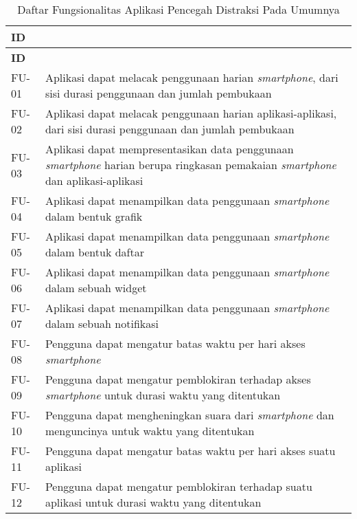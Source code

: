 \RaggedLeft
\begin{footnotesize}
\begin{longtable}[c]{|W{c}{0.08\textwidth}|>{\ccnormspacing}m{0.82\textwidth}|}
  \caption{Daftar Fungsionalitas Aplikasi Pencegah Distraksi Pada Umumnya}
  \label{tab:daftar_fungsionalitas_app_umum} \\
  \hline {} \textbf{ID} &  \\ \hline \endfirsthead
  \hline {} \textbf{ID} &  \\ \hline \endhead
  
  \hline \endfoot
  
  FU-01  &  Aplikasi dapat melacak penggunaan harian \textit{smartphone}, dari sisi durasi penggunaan dan jumlah pembukaan \\ \hline
  FU-02  &  Aplikasi dapat melacak penggunaan harian aplikasi-aplikasi, dari sisi durasi penggunaan dan jumlah pembukaan \\ \hline
  FU-03  &  Aplikasi dapat mempresentasikan data penggunaan \textit{smartphone} harian berupa ringkasan pemakaian \textit{smartphone} dan aplikasi-aplikasi \\ \hline
  FU-04  &  Aplikasi dapat menampilkan data penggunaan \textit{smartphone} dalam bentuk grafik \\ \hline
  FU-05  &  Aplikasi dapat menampilkan data penggunaan \textit{smartphone} dalam bentuk daftar \\ \hline
  FU-06  &  Aplikasi dapat menampilkan data penggunaan \textit{smartphone} dalam sebuah widget \\ \hline
  FU-07  &  Aplikasi dapat menampilkan data penggunaan \textit{smartphone} dalam sebuah notifikasi \\ \hline
  FU-08  &  Pengguna dapat mengatur batas waktu per hari akses \textit{smartphone} \\ \hline
  FU-09  &  Pengguna dapat mengatur pemblokiran terhadap akses \textit{smartphone} untuk durasi waktu yang ditentukan \\ \hline
  FU-10  &  Pengguna dapat mengheningkan suara dari \textit{smartphone} dan menguncinya untuk waktu yang ditentukan \\ \hline
  FU-11  &  Pengguna dapat mengatur batas waktu per hari akses suatu aplikasi \\ \hline
  FU-12  &  Pengguna dapat mengatur pemblokiran terhadap suatu aplikasi untuk durasi waktu yang ditentukan \\ \hline

\end{longtable}
\end{footnotesize}
